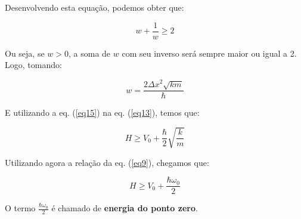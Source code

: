\documentclass[11pt, a4paper]{article}
\begin{document}
Desenvolvendo esta equação, podemos obter que:

\begin{equation}
    w + \frac{1}{w} \geq 2   \label{eq15}
\end{equation}

Ou seja, se $w > 0$, a soma de $w$ com seu inverso será sempre maior ou igual a 2. Logo, tomando:

\begin{equation}
    w = \frac{2{\Delta x}^2 \sqrt{km}}{\hbar}   \label{eq16}
\end{equation}

E utilizando a eq. (\ref{eq15}) na eq. (\ref{eq13}), temos que:

\begin{equation}
    H \geq V_0 + \frac{\hbar}{2}\sqrt{\frac{k}{m}}   \label{eq17}
\end{equation}

Utilizando agora a relação da eq. (\ref{eq9}), chegamos que:

\begin{equation}
    H \geq V_0 + \frac{\hbar {\omega}_0}{2}   \label{eq18}
\end{equation}

O termo $\frac{\hbar {\omega}_0}{2}$ é chamado de \textbf{energia do ponto zero}.
\end{document}
